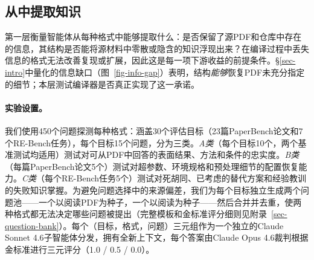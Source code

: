 \subsection{从\ara{}中提取知识}
\label{sec-eval-understanding}
\label{sec-eval-info-retrieval}\label{sec-eval-questions}\label{sec-eval-t2}

第一层衡量智能体从每种格式中能够提取什么：\ara{}是否保留了源PDF和仓库中存在的信息，其结构是否能将源材料中零散或隐含的知识浮现出来？在编译过程中丢失信息的格式无法改善复现或扩展，因此这是每一项下游收益的前提条件。\S\ref{sec-intro}中量化的信息缺口（图~\ref{fig-info-gap}）表明，结构\emph{能够}恢复PDF未充分指定的细节；本层测试编译器是否真正实现了这一承诺。

\paragraph{实验设置。}
我们使用450个问题探测每种格式：涵盖30个评估目标（23篇PaperBench论文和7个RE-Bench任务），每个目标15个问题，分为三类。\emph{A类}（每个目标10个，两个基准测试均适用）测试对可从PDF中回答的表面结果、方法和条件的忠实度。\emph{B类}（每篇PaperBench论文5个）测试对超参数、环境规格和预处理细节的配置恢复能力。\emph{C类}（每个RE-Bench任务5个）测试对死胡同、已考虑的替代方案和经验教训的失败知识掌握。为避免问题选择中的来源偏差，我们为每个目标独立生成两个问题池——一个以阅读PDF为种子，一个以阅读\ara{}为种子——然后合并并去重，使两种格式都无法决定哪些问题被提出（完整模板和金标准评分细则见附录~\ref{sec-question-bank}）。每个（目标，格式，问题）三元组作为一个独立的Claude Sonnet 4.6子智能体分发，拥有全新上下文，每个答案由Claude Opus 4.6裁判根据金标准进行三元评分（1.0 / 0.5 / 0.0）。

